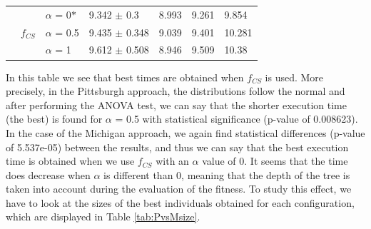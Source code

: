 \documentclass[runningheads]{llncs}
\begin{document}
\begin{table}
{\begin{tabular}{lll|l|l|l|l|}
		\multicolumn{1}{|l|}{}                                                                                                   & \multicolumn{1}{l|}{\multirow{3}{*}{$f_{CS}$}} & $\alpha$ = 0\textbf{$*$}   & 9.342 $\pm$ 0.3    & 8.993  & 9.261  & 9.854  \\ \cline{3-7} 
		\multicolumn{1}{|l|}{}                                                                                                   & \multicolumn{1}{l|}{}                          & $\alpha$ = 0.5 & 9.435 $\pm$ 0.348  & 9.039  & 9.401  & 10.281 \\ \cline{3-7} 
		\multicolumn{1}{|l|}{}                                                                                                   & \multicolumn{1}{l|}{}                          & $\alpha$ = 1   & 9.612 $\pm$ 0.508  & 8.946  & 9.509  & 10.38  \\ \hline
	\end{tabular}
}
	\label{tab:PvsMtime}
\end{table}

In this table we see that best times are obtained when $f_{CS}$ is used. More precisely, in the Pittsburgh approach, the distributions follow the normal and after performing the ANOVA test, we can say that the shorter execution time (the best) is found for $\alpha$ = 0.5 with statistical significance (p-value of 0.008623). In the case of the Michigan approach, we again find statistical differences (p-value of 5.537e-05) between the results, and thus we can say that the best execution time is obtained when we use $f_{CS}$ with an $\alpha$ value of 0. It seems that the time does decrease when $\alpha$ is different than 0, meaning that the depth of the tree is taken into account during the evaluation of the fitness. To study this effect, we have to look at the sizes of the best individuals obtained for each configuration, which are displayed in Table \ref{tab:PvsMsize}.
\end{document}
